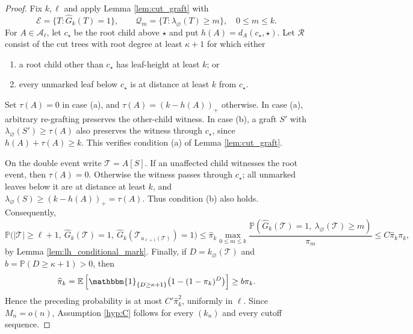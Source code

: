\documentclass[a4paper,11pt]{article}
\newcommand{\E}{\mathbb{E}}
\DeclareRobustCommand{\P}{\mathbb{P}}
\DeclareRobustCommand{\1}{\mathbf{1}}
\begin{document}
\begin{proof}
Fix $k,\ell$ and apply Lemma \ref{lem:cut_graft} with
$$
\mathcal E=\{T:\widehat G_k(T)=1\},
\qquad
\mathcal Q_m=\{T:\lambda_\varnothing(T)\ge m\},
\quad 0\le m\le k.
$$
For $A\in\mathscr A_\ell$, let $c_\star$ be the root child above $\star$
and put $h(A)=d_A(c_\star,\star)$.  Let $\mathscr R$ consist of  the  cut trees
with root degree at least $\kappa+1$ for which either
\begin{enumerate}
\item[(a)] a root child other than $c_\star$ has leaf-height at least $k$; or
\item[(b)] every unmarked leaf below $c_\star$ is at distance at least $k$
from $c_\star$.
\end{enumerate}
Set $\tau(A)=0$ in case \textup{(a)}, and
$\tau(A)=(k-h(A))_+$ otherwise.  In case \textup{(a)}, arbitrary re-grafting
preserves the other-child witness.  In case \textup{(b)}, a graft $S'$ with
$\lambda_\varnothing(S')\ge\tau(A)$ also preserves the witness through
$c_\star$, since $h(A)+\tau(A)\ge k$.  This verifies condition
\textup{(a)} of Lemma \ref{lem:cut_graft}.

On the double event write $\mathcal T=A[S]$.  If an unaffected child
witnesses the root event, then $\tau(A)=0$.  Otherwise the witness passes
through $c_\star$; all unmarked leaves below it are at distance at least
$k$, and
$\lambda_\varnothing(S)\ge(k-h(A))_+=\tau(A)$.  Thus condition
\textup{(b)} also holds.  Consequently,
$$
\P\bigl(|\mathcal T|\ge\ell+1,\ \widehat G_k(\mathcal T)=1,\
\widehat G_k(\mathcal T_{u_{\ell+1}(\mathcal T)})=1\bigr) \le\widehat\pi_k\max_{0\le m\le k}
\frac{\P(\widehat G_k(\mathcal T)=1,\
\lambda_\varnothing(\mathcal T)\ge m)}{\pi_m}
\le C\widehat\pi_k\pi_k,
$$
by Lemma \ref{lem:lh_conditional_mark}.  Finally, if
$D=k_\varnothing(\mathcal T)$ and $b=\P(D\ge\kappa+1)>0$, then
$$
\widehat\pi_k
=\E\left[\mathbbm{1}_{\{D\ge\kappa+1\}}
\bigl(1-(1-\pi_k)^D\bigr)\right]\ge b\pi_k.
$$
Hence the preceding probability is at most $C'\widehat\pi_k^2$, uniformly
in $\ell$.  Since $M_{n}=o(n)$, Assumption \ref{hyp:C} follows for
every $(k_n)$ and every cutoff sequence.
\end{proof}
\end{document}
